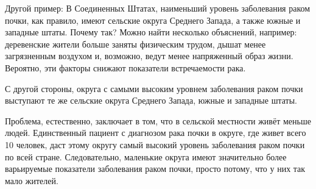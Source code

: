 Другой пример: В Соединенных Штатах, наименьший уровень заболевания раком почки, как правило, имеют сельские округа Среднего Запада, а также южные и западные штаты. Почему так? Можно найти несколько объяснений, например: деревенские жители больше заняты физическим трудом, дышат менее загрязненным воздухом и, возможно, ведут менее напряженный образ жизни. Вероятно, эти факторы снижают показатели встречаемости рака. 

С другой стороны, округа с самыми высоким уровнем заболевания раком почки выступают те же сельские округа Среднего Запада, южные и западные штаты.

Проблема, естественно, заключает в том, что в сельской местности живёт меньше людей. Единственный пациент с диагнозом рака почки в округе, где живет всего 10 человек, даст этому округу самый высокий уровень заболевания раком почки по всей стране. Следовательно, маленькие округа имеют значительно более варьируемые показатели заболевания раком почки, просто потому, что у них так мало жителей.\cite{gelman_all_1999}

